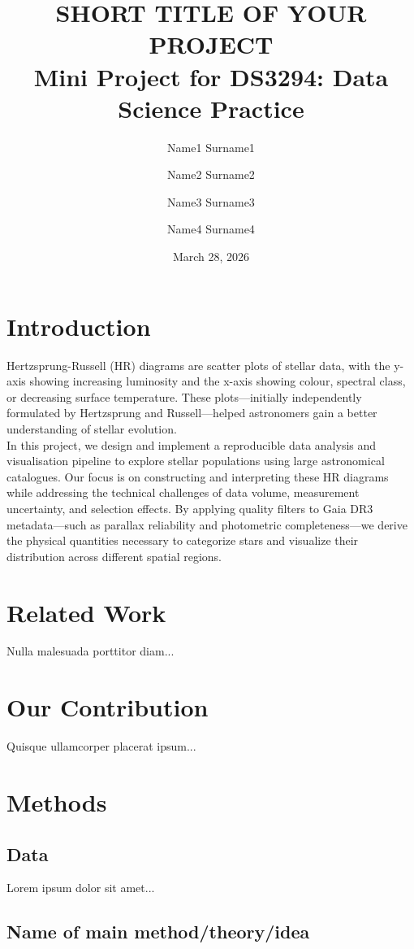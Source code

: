 \documentclass[11pt]{article}
\title{SHORT TITLE OF YOUR PROJECT\\
\large Mini Project for DS3294: Data Science Practice}
\author{Name1 Surname1 \and Name2 Surname2 \and Name3 Surname3 \and Name4 Surname4}
\date{March 28, 2026}
\begin{document}
\maketitle

\section{Introduction}

Hertzsprung-Russell (HR) diagrams are scatter plots of stellar data, with the y-axis showing increasing luminosity and the x-axis showing colour, spectral class, or decreasing surface temperature. These plots—initially independently formulated by Hertzsprung and Russell—helped astronomers gain a better understanding of stellar evolution. \\

\noindent In this project, we design and implement a reproducible data analysis and visualisation pipeline to explore stellar populations using large astronomical catalogues. Our focus is on constructing and interpreting these HR diagrams while addressing the technical challenges of data volume, measurement uncertainty, and selection effects. By applying quality filters to Gaia DR3 metadata—such as parallax reliability and photometric completeness—we derive the physical quantities necessary to categorize stars and visualize their distribution across different spatial regions.



\section{Related Work}
Nulla malesuada porttitor diam...

\section{Our Contribution}
Quisque ullamcorper placerat ipsum...

\section{Methods}

\subsection{Data}
Lorem ipsum dolor sit amet...

\subsection{Name of main method/theory/idea}
\end{document}
